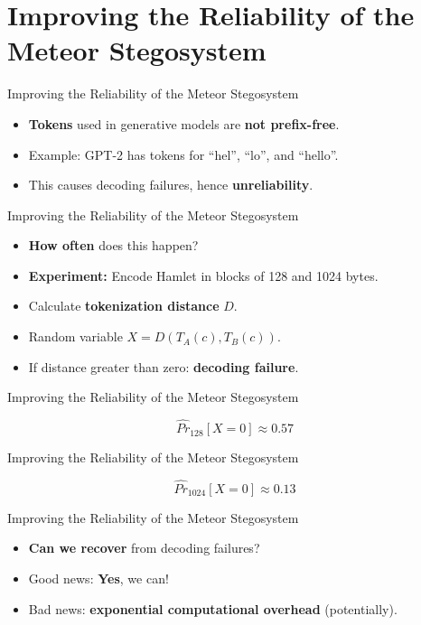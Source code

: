 \documentclass[10pt]{beamer}
\begin{document}
\section{Improving the Reliability of the Meteor Stegosystem}

\begin{frame}{Improving the Reliability of the Meteor Stegosystem}
	\begin{itemize}[<+->]
		\item \textbf{Tokens} used in generative models are \textbf{not prefix-free}.
		\item Example: GPT-2 has tokens for ``hel'', ``lo'', and ``hello''.
		\item This causes decoding failures, hence \textbf{unreliability}.
	\end{itemize}
\end{frame}

\begin{frame}{Improving the Reliability of the Meteor Stegosystem}
	\begin{itemize}[<+->]
		\item \textbf{How often} does this happen?
		\item \textbf{Experiment:} Encode Hamlet in blocks of 128 and 1024 bytes.
		\item Calculate \textbf{tokenization distance} $D$.
		\item Random variable $X = D(T_A(c), T_B(c))$.
		\item If distance greater than zero: \textbf{decoding failure}.
	\end{itemize}
\end{frame}

\begin{frame}{Improving the Reliability of the Meteor Stegosystem}
	\centering
	
	$$\hat{Pr}_{128}[X=0] \approx 0.57$$
\end{frame}

\begin{frame}{Improving the Reliability of the Meteor Stegosystem}
	\centering
	
	$$\hat{Pr}_{1024}[X=0] \approx 0.13$$
\end{frame}

\begin{frame}{Improving the Reliability of the Meteor Stegosystem}
	\begin{itemize}[<+->]
		\item \textbf{Can we recover} from decoding failures? 
		\item Good news: \textbf{Yes}, we can!
		\item Bad news: \textbf{exponential computational overhead} (potentially).
	\end{itemize}
\end{frame}
\end{document}
